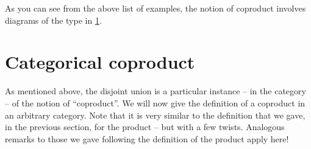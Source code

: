 
As you can see from the above list of examples, the notion of coproduct involves diagrams of the type in \cref{fig:coprod_generic}.

\begin{figure}[h!]
    \centering
    \caption{}
    \label{fig:coprod_generic}
\end{figure}

\section{Categorical coproduct}

As mentioned above, the disjoint union is a particular instance -- in the category \Set  -- of the notion of ``coproduct''.
We will now give the definition of a coproduct in an arbitrary category.
Note that it is very similar to the definition that we gave, in the previous section, for the product -- but with a few twists.
Analogous remarks to those we gave following the definition of the product apply here!

